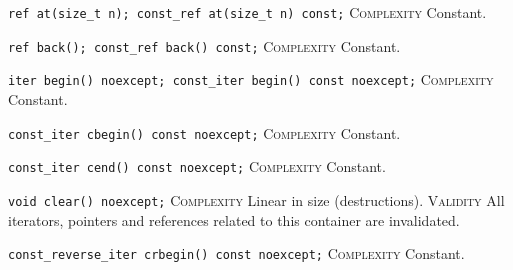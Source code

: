 \noindent{}\hspace*{0.25em}\lstinline[basicstyle=\ttfamily\color{cgreen}]{ref at(size_t n); const_ref at(size_t n) const;} \textsc{Complexity} Constant.\\\vspace{-0.6em}

\noindent{}\hspace*{0.25em}\lstinline[basicstyle=\ttfamily\color{cgreen}]{ref back(); const_ref back() const;} \textsc{Complexity} Constant.\\\vspace{-0.6em}

\noindent{}\hspace*{0.25em}\lstinline[basicstyle=\ttfamily\color{cgreen}]{iter begin() noexcept; const_iter begin() const noexcept;} \textsc{Complexity} Constant.\\\vspace{-0.6em}

\noindent{}\hspace*{0.25em}\lstinline[basicstyle=\ttfamily\color{cgreen}]{const_iter cbegin() const noexcept;} \textsc{Complexity} Constant.\\\vspace{-0.6em}

\noindent{}\hspace*{0.25em}\lstinline[basicstyle=\ttfamily\color{cgreen}]{const_iter cend() const noexcept;} \textsc{Complexity} Constant.\\\vspace{-0.6em}

\noindent{}\hspace*{0.25em}\lstinline[basicstyle=\ttfamily\color{corange}]{void clear() noexcept;} \textsc{Complexity} Linear in size (destructions). \textsc{Validity} All iterators, pointers and references related to this container are invalidated.\\\vspace{-0.6em}

\noindent{}\hspace*{0.25em}\lstinline[basicstyle=\ttfamily\color{cgreen}]{const_reverse_iter crbegin() const noexcept;} \textsc{Complexity} Constant.\\\vspace{-0.6em}

